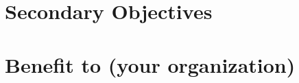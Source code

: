 \documentclass[conference]{IEEEtran} %
\begin{document}

\section{Secondary Objectives}
\label{sec:secondary-obj}

\section{Benefit to (your organization)}
\label{sec:benefit}
\end{document}
